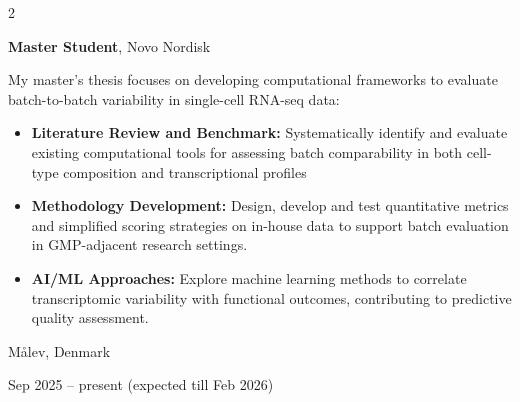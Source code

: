 \documentclass[10pt, letterpaper]{article}
\newenvironment{highlights}{
    \begin{itemize}[
        topsep=0.10 cm,
        parsep=0.10 cm,
        partopsep=0pt,
        itemsep=0pt,
        leftmargin=0.4 cm + 10pt
    ]
}{
    \end{itemize}
} %
\newenvironment{twocolentry}[2][]{
    \onecolentry
    \def\secondColumn{#2}
    \setcolumnwidth{\fill, 4.5 cm}
    \begin{paracol}{2}
}{
    \switchcolumn \raggedleft \secondColumn
    \end{paracol}
    \endonecolentry
} %
\begin{document}
        \begin{twocolentry}{
    Målev, Denmark

    Sep 2025 – present (expected till Feb 2026)
}
    \textbf{Master Student}, Novo Nordisk

    \vspace{0.1cm}
    
     My master’s thesis focuses on developing computational frameworks to evaluate batch-to-batch variability in single-cell RNA-seq data:

    \begin{highlights}
        \item \textbf{Literature Review and Benchmark:} Systematically identify and evaluate existing computational tools for assessing batch comparability in both cell-type composition and transcriptional profiles

        \vspace{0.1cm}

        \item \textbf{Methodology Development:} Design, develop and test quantitative metrics and simplified scoring strategies on in-house data to support batch evaluation in GMP-adjacent research settings.

        \vspace{0.1cm}

        \item \textbf{AI/ML Approaches:} Explore machine learning methods to correlate transcriptomic variability with functional outcomes, contributing to predictive quality assessment.


    \end{highlights}
\end{twocolentry}


        \vspace{0.3 cm}
\end{document}
